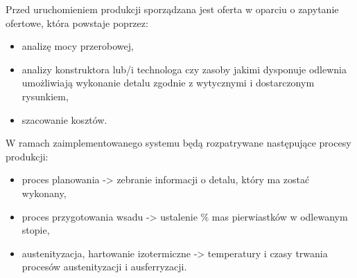 Przed uruchomieniem produkcji sporządzana jest oferta w oparciu o zapytanie ofertowe, która powstaje poprzez:
\begin{itemize}
    \item analizę mocy przerobowej,
    \item analizy konstruktora lub/i technologa czy zasoby jakimi dysponuje odlewnia umożliwiają wykonanie detalu zgodnie z wytycznymi i dostarczonym rysunkiem,
    \item szacowanie kosztów.
\end{itemize}

W ramach zaimplementowanego systemu będą rozpatrywane następujące procesy produkcji:
\begin{itemize}
    \item proces planowania -> zebranie informacji o detalu, który ma zostać wykonany,
    \item proces przygotowania wsadu -> ustalenie \% mas pierwiastków w odlewanym stopie,
    \item austenityzacja, hartowanie izotermiczne -> temperatury i czasy trwania procesów austenityzacji i ausferryzacji.

\end{itemize}

